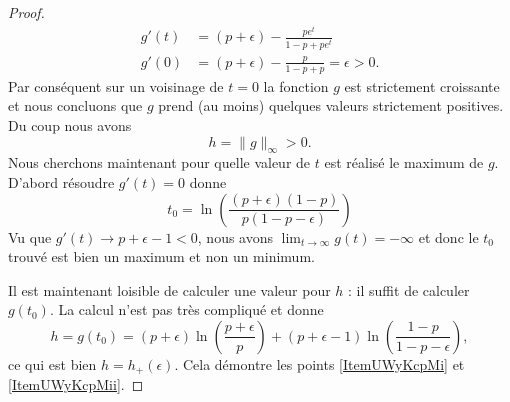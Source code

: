 \begin{proof}
\begin{subequations}
\begin{align}
            g'(t)&=(p+\epsilon)- \frac{ pe^t }{ 1-p+pe^t }\\
            g'(0)&=(p+\epsilon)- \frac{ p }{ 1-p+p }=\epsilon>0.
        \end{align}
    \end{subequations}
    Par conséquent sur un voisinage de \( t=0\) la fonction \( g\) est strictement croissante et nous concluons que \( g\) prend (au moins) quelques valeurs strictement positives. Du coup nous avons
    \begin{equation}
        h=\| g \|_{\infty}>0.
    \end{equation}
    Nous cherchons maintenant pour quelle valeur de \( t\) est réalisé le maximum de \( g\). D'abord résoudre \( g'(t)=0\) donne
    \begin{equation}
        t_0=\ln\left( \frac{ (p+\epsilon)(1-p) }{ p(1-p-\epsilon) } \right)
    \end{equation}
    Vu que \( g'(t)\to p+\epsilon-1<0\), nous avons \( \lim_{t\to \infty} g(t)=-\infty\) et donc le \( t_0\) trouvé est bien un maximum et non un minimum.

    Il est maintenant loisible de calculer une valeur pour \( h\) : il suffit de calculer \( g(t_0)\). La calcul n'est pas très compliqué et donne
    \begin{equation}
        h=g(t_0)=(p+\epsilon)\ln\left( \frac{ p+\epsilon }{ p } \right)+(p+\epsilon-1)\ln\left( \frac{ 1-p }{ 1-p-\epsilon } \right),
    \end{equation}
    ce qui est bien \( h=h_+(\epsilon)\). Cela démontre les points \ref{ItemUWyKcpMi} et \ref{ItemUWyKcpMii}.


\end{proof}
